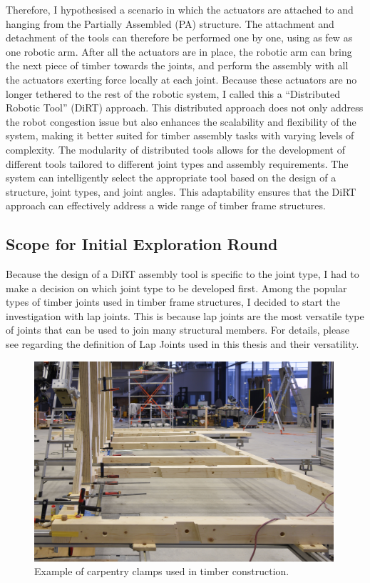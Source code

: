 Therefore, I hypothesised a scenario in which the actuators are attached to and hanging from the Partially Assembled (PA) structure. The attachment and detachment of the tools can therefore be performed one by one, using as few as one robotic arm. After all the actuators are in place, the robotic arm can bring the next piece of timber towards the joints, and perform the assembly with all the actuators exerting force locally at each joint. Because these actuators are no longer tethered to the rest of the robotic system, I called this a “Distributed Robotic Tool” (DiRT) approach. 
This distributed approach does not only address the robot congestion issue but also enhances the scalability and flexibility of the system, making it better suited for timber assembly tasks with varying levels of complexity. The modularity of distributed tools allows for the development of different tools tailored to different joint types and assembly requirements. The system can intelligently select the appropriate tool based on the design of a structure, joint types, and joint angles. This adaptability ensures that the DiRT approach can effectively address a wide range of timber frame structures.

\subsection{Scope for Initial Exploration Round}
\label{subsection:exploration-1-scope-for-initial-exploration-round}

Because the design of a DiRT assembly tool is specific to the joint type, I had to make a decision on which joint type to be developed first. Among the popular types of timber joints used in timber frame structures, I decided to start the investigation with lap joints. This is because lap joints are the most versatile type of joints that can be used to join many structural members. For details, please see  regarding the definition of Lap Joints used in this thesis and their versatility.

\begin{figure}
    \centering
    \includegraphics[width=0.99\textwidth]{images/04-1+2/clamp-inspiration.jpeg}
    \caption{Example of carpentry clamps used in timber construction.}
    \label{fig:clamp-inspiration}
\end{figure}

